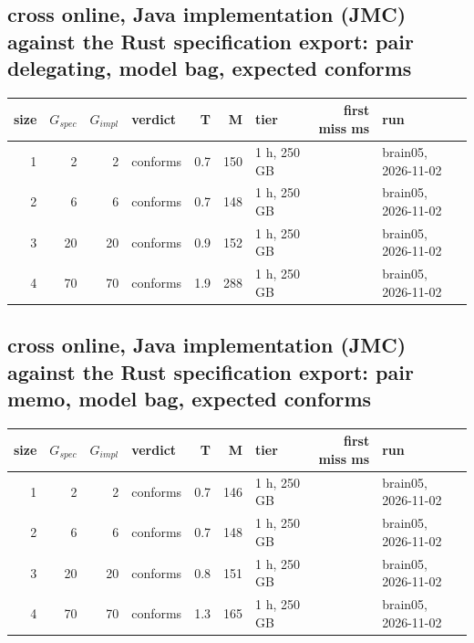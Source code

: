 \documentclass[10pt]{article}
\begin{document}
\subsection*{cross online, Java implementation (JMC) against the Rust specification export: pair \textsf{delegating}, model bag, expected conforms}
\begin{longtable}{@{}rrrlrrlrl@{}}
\toprule
size & $G_{\mathit{spec}}$ & $G_{\mathit{impl}}$ & verdict & T & M & tier & first miss ms & run \\
\midrule
\endhead
\color{red} 1 & 2 & 2 & conforms & 0.7 & 150 & 1 h, 250 GB &  & brain05, 2026-11-02 \\
\color{red} 2 & 6 & 6 & conforms & 0.7 & 148 & 1 h, 250 GB &  & brain05, 2026-11-02 \\
\color{red} 3 & 20 & 20 & conforms & 0.9 & 152 & 1 h, 250 GB &  & brain05, 2026-11-02 \\
\color{red} 4 & 70 & 70 & conforms & 1.9 & 288 & 1 h, 250 GB &  & brain05, 2026-11-02 \\
\bottomrule
\end{longtable}
\subsection*{cross online, Java implementation (JMC) against the Rust specification export: pair \textsf{memo}, model bag, expected conforms}
\begin{longtable}{@{}rrrlrrlrl@{}}
\toprule
size & $G_{\mathit{spec}}$ & $G_{\mathit{impl}}$ & verdict & T & M & tier & first miss ms & run \\
\midrule
\endhead
\color{red} 1 & 2 & 2 & conforms & 0.7 & 146 & 1 h, 250 GB &  & brain05, 2026-11-02 \\
\color{red} 2 & 6 & 6 & conforms & 0.7 & 148 & 1 h, 250 GB &  & brain05, 2026-11-02 \\
\color{red} 3 & 20 & 20 & conforms & 0.8 & 151 & 1 h, 250 GB &  & brain05, 2026-11-02 \\
\color{red} 4 & 70 & 70 & conforms & 1.3 & 165 & 1 h, 250 GB &  & brain05, 2026-11-02 \\
\bottomrule
\end{longtable}
\end{document}
